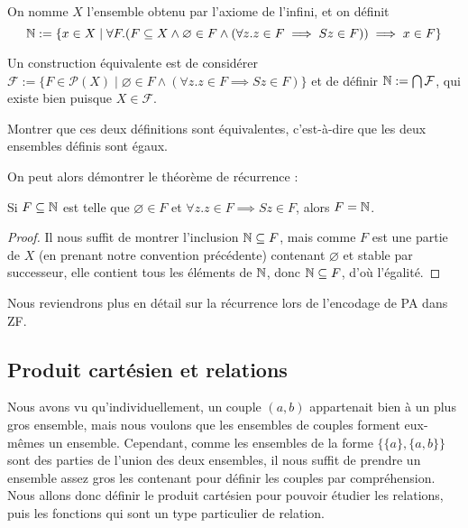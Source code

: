 \begin{defi}
    On nomme $X$ l'ensemble obtenu par l'axiome de l'infini, et on définit $$\mathbb{N} := \{ x \in X \mid \forall F.(F\subseteq X \land \varnothing \in F\land (\forall z.z\in F\implies Sz \in F))\implies x\in F\}$$

    Un construction équivalente est de considérer $\mathcal F := \{F\in\mathcal P(X)\mid \varnothing \in F \land (\forall z. z\in F \implies Sz \in F)\}$ et de définir $\mathbb{N} := \bigcap \mathcal F$, qui existe bien puisque $X\in\mathcal F$.
\end{defi}

\begin{exo}
    Montrer que ces deux définitions sont équivalentes, c'est-à-dire que les deux ensembles définis sont égaux.
\end{exo}

On peut alors démontrer le théorème de récurrence :

\begin{prop}[Récurrence]
    Si $F\subseteq \mathbb{N}$ est telle que $\varnothing \in F$ et $\forall z.z\in F \implies Sz\in F$, alors $F=\mathbb{N}$.
\end{prop}

\begin{proof}
    Il nous suffit de montrer l'inclusion $\mathbb{N}\subseteq F$, mais comme $F$ est une partie de $X$ (en prenant notre convention précédente) contenant $\varnothing$ et stable par successeur, elle contient tous les éléments de $\mathbb{N}$, donc $\mathbb{N}\subseteq F$, d'où l'égalité.
\end{proof}

Nous reviendrons plus en détail sur la récurrence lors de l'encodage de PA dans ZF.

\subsection{Produit cartésien et relations}

Nous avons vu qu'individuellement, un couple $(a,b)$ appartenait bien à un plus gros ensemble, mais nous voulons que les ensembles de couples forment eux-mêmes un ensemble. Cependant, comme les ensembles de la forme $\{\{a\},\{a,b\}\}$ sont des parties de l'union des deux ensembles, il nous suffit de prendre un ensemble assez gros les contenant pour définir les couples par compréhension. Nous allons donc définir le produit cartésien pour pouvoir étudier les relations, puis les fonctions qui sont un type particulier de relation.

